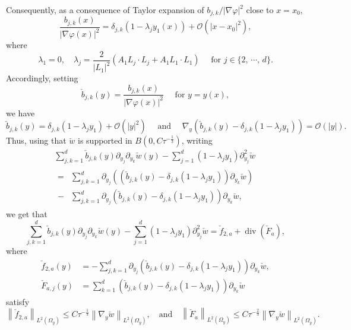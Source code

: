 \documentclass[10pt]{amsart}
\theoremstyle{definition}\newtheorem{defi}[theo]{Definition}\newtheorem{rema}[theo]{Remark}\newtheorem{exam}[theo]{Example}\newtheorem{exem}[theo]{Example}\newtheorem{nota}[theo]{Notation}
\newcommand{\clO}{\mathcal{O}}
\renewcommand{\leq}{\leqslant}
\renewcommand{\div}{\operatorname{div}}
\begin{document}
Consequently, as a consequence of Taylor expansion of $b_{j,k}/|\nabla \varphi|^2$ close to $x = x_0$,
\[
\frac{b_{j,k}(x)}{|\nabla \varphi(x)|^2} =
\delta_{j,k}\left(1 - \lambda_j y_1(x)\right)+ \clO\left(|x-x_0|^2\right),
\]
where
\begin{equation}\label{Link-Lambda-j-Pseudo}
\lambda_1 = 0, \quad \lambda_j = \frac{2}{|L_1|^2} (A_1 L_j \cdot L_j + A_1 L_1 \cdot L_1) \quad \text{ for } j \in \{2,\, \cdots,\, d\}.
\end{equation}
Accordingly, setting
\[
\check b_{j,k}(y) = \frac{b_{j,k}(x)}{|\nabla \varphi(x)|^2} \quad \text{ for } y = y(x),
\]
we have
\[
\check b_{j,k}(y) = \delta_{j,k} (1- \lambda_j y_1) + \clO(|y|^2)
\quad \text{ and } \quad
\nabla_y \left(\check b_{j,k}(y)- \delta_{j,k} \left(1-\lambda_j y_1\right)\right) = \clO(|y|).
\]
Thus, using that $\check w$ is supported in $B(0, C \tau^{-\frac{1}{3}})$, writing
\begin{multline*}
\sum_{j,k = 1}^d \check b_{j,k}(y) \partial_{y_j} \partial_{y_k} \check w(y) -
\sum_{j = 1}^d (1 - \lambda_j y_1) \partial_{y_j}^2 \check w
\\
\begin{aligned}
=
&\sum_{j,k = 1}^d \partial_{y_j} \left(\left(\check b_{j,k}(y) - \delta_{j,k} (1 - \lambda_j y_1) \right) \partial_{y_{k}} \check w \right) \\
-
&\sum_{j,k = 1}^d \partial_{y_j} \left(\check b_{j,k}(y)- \delta_{j,k} \left(1-\lambda_j y_1\right)\right) \partial_{y_{k}} \check w,
\end{aligned}
\end{multline*}
we get that
\[
\sum_{j,k = 1}^d \check b_{j,k}(y) \partial_{y_j} \partial_{y_k} \check w(y) -
\sum_{j = 1}^d \left(1 - \lambda_j y_1\right) \partial_{y_j}^2 \check w =
\check f_{2,a} + \div\left(\check F_a\right),
\]
where
\begin{align*}
\check f_{2,a} (y) &= -
\sum_{j,k = 1}^d \partial_{y_j} \left(\check b_{j,k}(y)- \delta_{j,k} \left(1-\lambda_j y_1\right)\right) \partial_{y_{k}} \check w,
\\
\check F_{a,j}(y) &= \sum_{k = 1}^d \left(\check b_{j,k}(y) - \delta_{j,k} \left(1 - \lambda_j y_1\right) \right) \partial_{y_{k}} \check w
\end{align*}
satisfy
\begin{equation*}
\left\| \check f_{2,a} \right\|_{L^2(\Omega_y)} \leq C \tau^{-\frac{1}{3}} \left\| \nabla_y \check w\right\|_{L^2(\Omega_y)},
\quad \text{and} \quad
\left\| \check F_a\right\|_{L^2(\Omega_y)} \leq C \tau^{-\frac{2}{3}} \left\| \nabla_y \check w\right\|_{L^2(\Omega_y)}.
\end{equation*}
\end{document}
